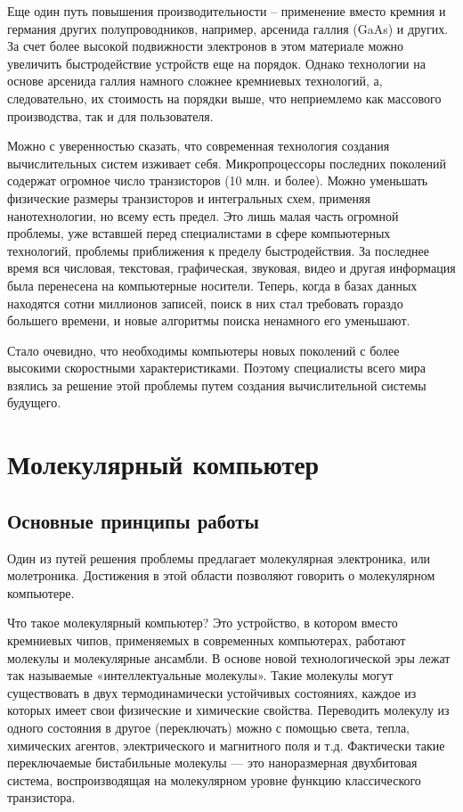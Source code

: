 \documentclass[titlepage, 12pt]{article}
\begin{document}
Еще один путь повышения производительности – применение вместо кремния и германия других полупроводников, например, арсенида галлия (GaAs) и других. За счет более высокой подвижности электронов в этом материале можно увеличить быстродействие устройств еще на порядок. Однако технологии на основе арсенида галлия намного сложнее кремниевых технологий, а, следовательно, их стоимость на порядки выше, что неприемлемо как массового производства, так и для пользователя.

Можно с уверенностью сказать, что современная технология создания вычислительных систем изживает себя. Микропроцессоры последних поколений содержат огромное число транзисторов (10 млн. и более). Можно уменьшать физические размеры транзисторов и интегральных схем, применяя нанотехнологии, но всему есть предел. Это лишь малая часть огромной проблемы, уже вставшей перед специалистами в сфере компьютерных технологий, проблемы приближения к пределу быстродействия. За последнее время вся числовая, текстовая, графическая, звуковая, видео и другая информация была перенесена на компьютерные носители. Теперь, когда в базах данных находятся сотни миллионов записей, поиск в них стал требовать гораздо большего времени, и новые алгоритмы поиска ненамного его уменьшают.

Стало очевидно, что необходимы компьютеры новых поколений с более высокими скоростными характеристиками. Поэтому специалисты всего мира взялись за решение этой проблемы путем создания вычислительной системы будущего.


\section{Молекулярный компьютер}

\subsection{Основные принципы работы}
Один из путей решения проблемы предлагает молекулярная электроника, или молетроника. Достижения в этой области позволяют говорить о молекулярном компьютере.

Что такое молекулярный компьютер? Это устройство, в котором вместо кремниевых чипов, применяемых в современных компьютерах, работают молекулы и молекулярные ансамбли. В основе новой технологической эры лежат так называемые «интеллектуальные молекулы». Такие молекулы могут существовать в двух термодинамически устойчивых состояниях, каждое из которых имеет свои физические и химические свойства. Переводить молекулу из одного состояния в другое (переключать) можно с помощью света, тепла, химических агентов, электрического и магнитного поля и т.д. Фактически такие переключаемые бистабильные молекулы — это наноразмерная двухбитовая система, воспроизводящая на молекулярном уровне функцию классического транзистора.
\end{document}
